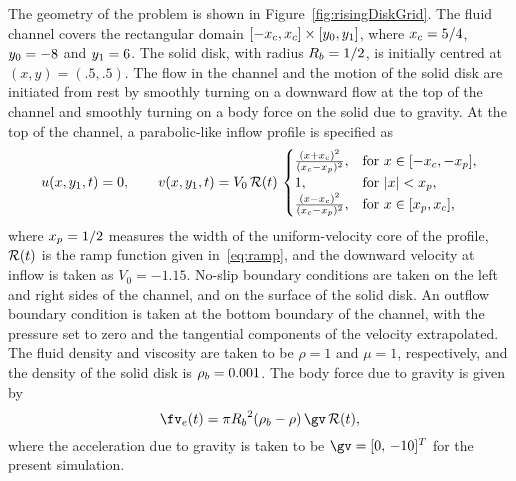 The geometry of the problem is shown in Figure~\ref{fig:risingDiskGrid}.  The fluid channel
covers the rectangular domain $[-{x_c},{x_c}]\times[{y_0},{y_1}]$,
where ${x_c}=5/4$, ${y_0}=-8$ and ${y_1}=6$.  
The solid disk, with radius ${R_b}=1/2$, is initially centred at $(x,y)=(.5,.5)$. 
The flow in the channel and the motion of the solid disk are initiated from
rest by smoothly turning on a downward flow at the top of the channel and  smoothly turning on a body
force on the solid due to gravity.
At the top of the channel, a parabolic-like inflow profile is
specified as
\begin{align*}
    u(x,{y_1},t)=0,\qquad 
    v(x,{y_1},t) = V_0\,{\cal R}(t)\,
                \begin{cases} 
                    \frac{(x+{x_c})^2}{({x_c}-{x_p})^2},   & \text{for $x\in[-{x_c},-{x_p}]$}, \\
                    1    ,                      & \text{for $|x|< {x_p}$}, \\
                    \frac{(x-{x_c})^2}{({x_c}-{x_p})^2},   & \text{for $x\in[{x_p},{x_c}]$},
                 \end{cases}
\end{align*}
where ${x_p}=1/2$ measures the width of the uniform-velocity core of the profile, ${\cal R}(t)$ is the ramp function given in~\eqref{eq:ramp}, and the downward
velocity at inflow is taken as $V_0=-1.15$. 
No-slip boundary conditions are taken on the left and right sides of the channel, and on
the surface of the solid disk.  
An outflow boundary condition is taken at the bottom boundary of the channel, with the
pressure set to zero and the tangential components of the velocity extrapolated.
The fluid density and viscosity are taken to be $\rho=1$ and $\mu=1$, respectively, and the
density of the solid disk is ${\rho_b}=0.001$.  The body force due to gravity is given by
\[
\fvbe(t)=\pi\diskRadius\sp2(\rho_b-\rho) \, \gv \, \rampFunction(t),
\]
where the acceleration due to gravity is taken to be $\gv=[0,\,-10]\sp{T}$ for the present simulation.




